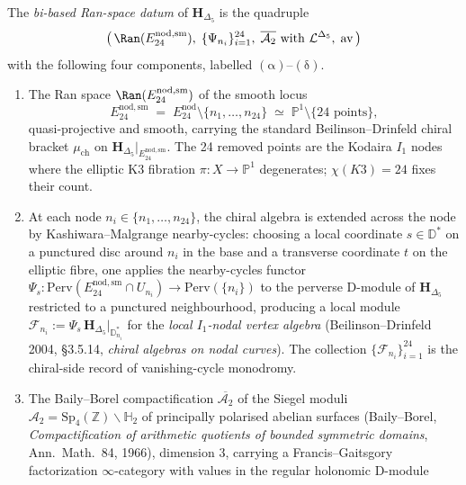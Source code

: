 \begin{definition}
\label{def:bar-cobar-bi-based-ran-datum}
The \emph{bi-based Ran-space datum} of $\mathbf{H}_{\Delta_5}$ is the quadruple
\[
 \bigl(\,
 \Ran(E^{\mathrm{nod,sm}}_{24}),\;
 \{\Psi_{n_i}\}_{i=1}^{24},\;
 \overline{\mathcal{A}_2}\text{ with }\mathcal{L}^{\Delta_5},\;
 \mathrm{av}
 \,\bigr)
\]
with the following four components, labelled $\mathrm{(\alpha)}$--$\mathrm{(\delta)}$.
\begin{enumerate}[label=\textup{($\alpha$--$\delta$)}, leftmargin=*]
\item[\textup{($\alpha$)} \emph{Chiral base.}]
 The Ran space $\Ran(E^{\mathrm{nod,sm}}_{24})$ of the smooth locus
 \[
 E^{\mathrm{nod,sm}}_{24}
 \;=\;
 E^{\mathrm{nod}}_{24}\setminus\{n_1,\ldots,n_{24}\}
 \;\simeq\;
 \mathbb{P}^1\setminus\{24\text{ points}\},
 \]
 quasi-projective and smooth, carrying the standard Beilinson--Drinfeld chiral bracket $\mu_{\mathrm{ch}}$ on $\mathbf{H}_{\Delta_5}|_{E^{\mathrm{nod,sm}}_{24}}$. The 24 removed points are the Kodaira $I_1$ nodes where the elliptic K3 fibration $\pi\colon X\to \mathbb{P}^1$ degenerates; $\chi(K3)=24$ fixes their count.
\item[\textup{($\beta$)} \emph{Nearby-cycles continuation.}]
 At each node $n_i\in\{n_1,\ldots,n_{24}\}$, the chiral algebra is extended across the node by Kashiwara--Malgrange nearby-cycles: choosing a local coordinate $s\in\mathbb{D}^*$ on a punctured disc around $n_i$ in the base and a transverse coordinate $t$ on the elliptic fibre, one applies the nearby-cycles functor $\Psi_s\colon \mathrm{Perv}(E^{\mathrm{nod,sm}}_{24}\cap U_{n_i})\to \mathrm{Perv}(\{n_i\})$ to the perverse D-module of $\mathbf{H}_{\Delta_5}$ restricted to a punctured neighbourhood, producing a local module $\mathcal{F}_{n_i}:= \Psi_s\,\mathbf{H}_{\Delta_5}|_{\mathbb{D}^*_{n_i}}$ for the \emph{local $I_1$-nodal vertex algebra} (Beilinson--Drinfeld 2004, \S3.5.14, \emph{chiral algebras on nodal curves}). The collection $\{\mathcal{F}_{n_i}\}_{i=1}^{24}$ is the chiral-side record of vanishing-cycle monodromy.
\item[\textup{($\gamma$)} \emph{Parameter base.}]
 The Baily--Borel compactification $\overline{\mathcal{A}_2}$ of the Siegel moduli $\mathcal{A}_2 = \mathrm{Sp}_4(\mathbb{Z})\backslash\mathbb{H}_2$ of principally polarised abelian surfaces (Baily--Borel, \emph{Compactification of arithmetic quotients of bounded symmetric domains}, Ann.~Math.~84, 1966), dimension $3$, carrying a Francis--Gaitsgory factorization $\infty$-category with values in the regular holonomic D-module

\end{enumerate}
\end{definition}
